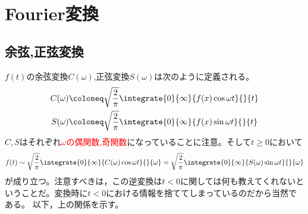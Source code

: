 \chapter{Fourier変換}
    \section{余弦,正弦変換}
        $f(t)$の余弦変換$C(\omega)$,正弦変換$S(\omega)$は次のように定義される。
        \begin{align*}
            C(\omega) &\coloneq \sqrt{\frac{2}{\pi}}\integrate{0}{\infty}{f(x)\cos{\omega t}}{}{t}\\
            S(\omega) &\coloneq \sqrt{\frac{2}{\pi}}\integrate{0}{\infty}{f(x)\sin{\omega t}}{}{t}
        \end{align*}
        $C,S$はそれぞれ\textcolor{red}{$\omega$の偶関数,奇関数}になっていることに注意。そして$t\geq0$において
        \begin{equation}
            f(t) \sim \sqrt{\frac{2}{\pi}}\integrate{0}{\infty}{C(\omega)\cos{\omega t}}{}{\omega} = \sqrt{\frac{2}{\pi}}\integrate{0}{\infty}{S(\omega)\sin{\omega t}}{}{\omega} \nonumber
        \end{equation}
        が成り立つ。注意すべきは，この逆変換は$t<0$に関しては何も教えてくれないということだ。変換時に$t<0$における情報を捨ててしまっているのだから当然である。
        以下，上の関係を示す。
        \newline\par
